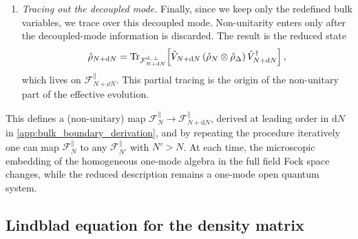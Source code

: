 \documentclass{article}
\def\Tr{\mathrm{Tr}}
\numberwithin{equation}{section}
\begin{document}
\begin{enumerate}
			\item \textit{Tracing out the decoupled mode.} Finally, since we keep only the redefined bulk variables, we trace over this decoupled mode. Non-unitarity enters only after the decoupled-mode information is discarded. The result is the reduced state
			\[
			\hat\rho_{N+\dd N}
			=
			\Tr_{\mathcal F^{\rm d,\, \perp}_{N+\dd N}}
			\!\left[
			\hat V_{N+\dd N}
			\left(\hat\rho_N\otimes\hat\rho_\Delta\right)
			\hat V_{N+\dd N}^\dagger
			\right],
			\]
			which lives on \(\mathcal F_{N+\dd N}^\parallel\). This partial tracing is the origin of the non-unitary part of the effective evolution.
		\end{enumerate}
		This defines a (non-unitary) map $\mathcal{F}_{N}^\parallel\to \mathcal{F}_{N+\mathrm{d}N}^\parallel$, derived at leading order in $\mathrm{d}N$ in \cref{app:bulk_boundary_derivation}, and by repeating the procedure iteratively one can map $\mathcal{F}_{N}^\parallel$ to any $\mathcal{F}_{N'}^\parallel$ with $N'>N$. At each time, the microscopic embedding of the homogeneous one-mode algebra in the full field Fock space changes, while the reduced description remains a one-mode open quantum system.

	\subsection{Lindblad equation for the density matrix}
\end{document}
